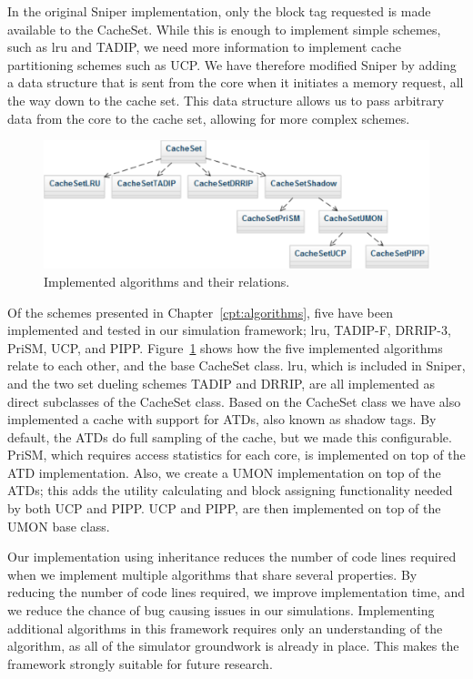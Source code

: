 In the original Sniper implementation, only the block tag requested is made available to the CacheSet. 
While this is enough to implement simple schemes, such as \gls{lru} and TADIP, we need more information to implement cache partitioning schemes such as UCP.
We have therefore modified Sniper by adding a data structure that is sent from the core when it initiates a memory request, all the way down to the cache set.
This data structure allows us to pass arbitrary data from the core to the cache set, allowing for more complex schemes.

\begin{figure}[ht]
\centering
\includegraphics[scale=0.7]{figures/framework/algorithms}
\caption{Implemented algorithms and their relations.}
\label{fig:framework:implementation:algorithms}
\end{figure}

Of the schemes presented in Chapter~\ref{cpt:algorithms}, five have been implemented and tested in our simulation framework; \gls{lru}, TADIP-F, DRRIP-3, PriSM, UCP, and PIPP.
Figure~\ref{fig:framework:implementation:algorithms} shows how the five implemented algorithms relate to each other, and the base CacheSet class.
\gls{lru}, which is included in Sniper, and the two set dueling schemes TADIP and DRRIP, are all implemented as direct subclasses of the CacheSet class.
Based on the CacheSet class we have also implemented a cache with support for ATDs, also known as shadow tags.
By default, the ATDs do full sampling of the cache, but we made this configurable.
PriSM, which requires access statistics for each core, is implemented on top of the ATD implementation.
Also, we create a UMON implementation on top of the ATDs; this adds the utility calculating and block assigning functionality needed by both UCP and PIPP.
UCP and PIPP, are then implemented on top of the UMON base class.

Our implementation using inheritance reduces the number of code lines required when we implement multiple algorithms that share several properties.
By reducing the number of code lines required, we improve implementation time, and we reduce the chance of bug causing issues in our simulations.
Implementing additional algorithms in this framework requires only an understanding of the algorithm, as all of the simulator groundwork is already in place.
This makes the framework strongly suitable for future research.